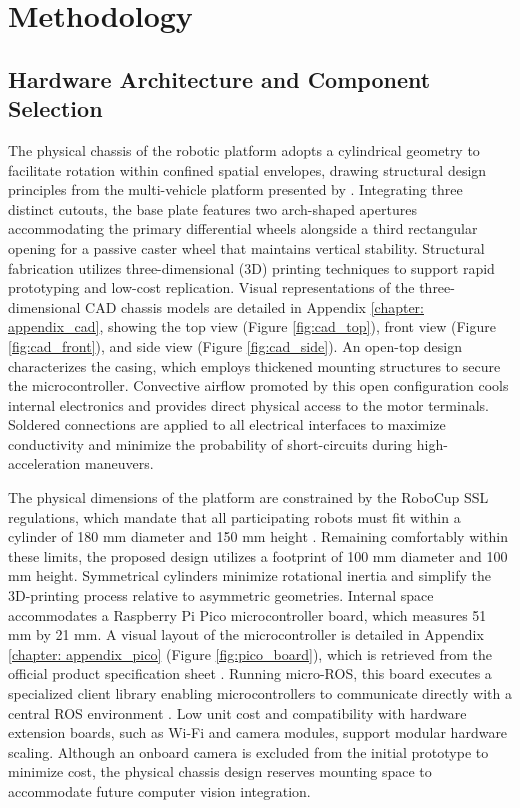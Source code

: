\documentclass[a4paper,twoside,12pt]{report}
\begin{document}
\chapter{Methodology}\label{chapter: methodology}

\section{Hardware Architecture and Component Selection}

The physical chassis of the robotic platform adopts a cylindrical geometry to facilitate rotation within confined spatial envelopes, drawing structural design principles from the multi-vehicle platform presented by \citet{yu2017portable}. Integrating three distinct cutouts, the base plate features two arch-shaped apertures accommodating the primary differential wheels alongside a third rectangular opening for a passive caster wheel that maintains vertical stability. Structural fabrication utilizes three-dimensional (3D) printing techniques to support rapid prototyping and low-cost replication. Visual representations of the three-dimensional CAD chassis models are detailed in Appendix \ref{chapter: appendix_cad}, showing the top view (Figure \ref{fig:cad_top}), front view (Figure \ref{fig:cad_front}), and side view (Figure \ref{fig:cad_side}). An open-top design characterizes the casing, which employs thickened mounting structures to secure the microcontroller. Convective airflow promoted by this open configuration cools internal electronics and provides direct physical access to the motor terminals. Soldered connections are applied to all electrical interfaces to maximize conductivity and minimize the probability of short-circuits during high-acceleration maneuvers.

The physical dimensions of the platform are constrained by the RoboCup SSL regulations, which mandate that all participating robots must fit within a cylinder of 180 mm diameter and 150 mm height \citep{ssl_rules_2026}. Remaining comfortably within these limits, the proposed design utilizes a footprint of 100 mm diameter and 100 mm height. Symmetrical cylinders minimize rotational inertia and simplify the 3D-printing process relative to asymmetric geometries. Internal space accommodates a Raspberry Pi Pico microcontroller board, which measures 51 mm by 21 mm. A visual layout of the microcontroller is detailed in Appendix \ref{chapter: appendix_pico} (Figure \ref{fig:pico_board}), which is retrieved from the official product specification sheet \citep{pico_datasheet}. Running micro-ROS, this board executes a specialized client library enabling microcontrollers to communicate directly with a central ROS environment \citep{macenski2022robot}. Low unit cost and compatibility with hardware extension boards, such as Wi-Fi and camera modules, support modular hardware scaling. Although an onboard camera is excluded from the initial prototype to minimize cost, the physical chassis design reserves mounting space to accommodate future computer vision integration.
\end{document}

